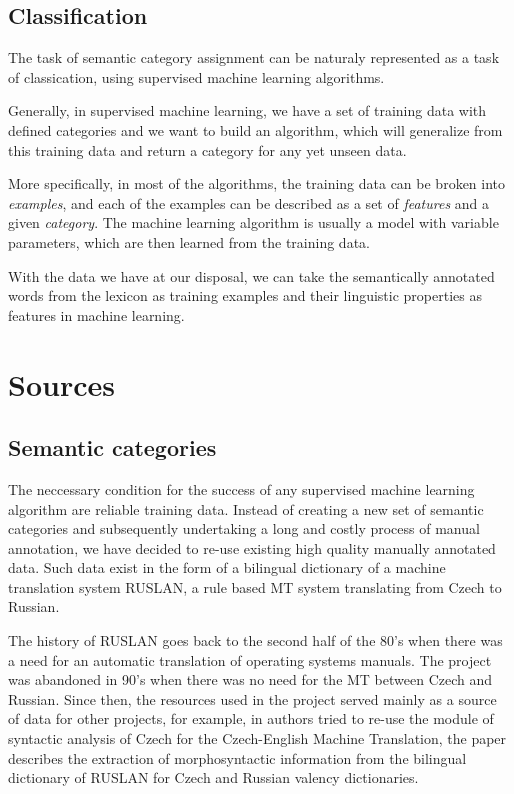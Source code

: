 \documentclass[letterpaper]{article}
\begin{document}
\subsection{Classification}
The task of semantic category assignment can be naturaly represented as a task of classication, using supervised machine learning algorithms.

Generally, in supervised machine learning, we have a set of training data with defined 
categories and we want to build an algorithm, which will generalize from this training data and return a category for any yet unseen data.

More specifically, in most of the algorithms, the training data can be broken into
\textit{examples}, and each of the examples can be described as a set of \textit{features} and a given \textit{category}. The machine learning algorithm is usually a model with variable parameters, which are then learned from the training data.

With the data we have at our disposal, we can take the semantically annotated words from the lexicon as training examples 
and their linguistic properties as features in machine learning.


\section{Sources}
\subsection{Semantic categories}
The neccessary condition for the success of any supervised machine learning algorithm are reliable training data. Instead of creating a new set of semantic categories and subsequently undertaking a long and costly process of manual annotation, we have decided to re-use existing high quality manually annotated data. Such data exist in the form of a bilingual dictionary of a machine translation system RUSLAN, a rule based MT system translating from Czech to Russian.

The history of RUSLAN \cite{oliva1989parser} goes back to the second half of the 80's when there was a need for an automatic translation of operating systems manuals. The project was abandoned in 90's when
there was no need for the MT between Czech and Russian. Since then, the resources used in the project served mainly as a source of data for other projects, for
example, in \cite{mt-recycled} authors tried to re-use the module
of syntactic analysis of Czech for the Czech-English Machine Translation,
the paper \cite{pisa2010} describes the extraction of morphosyntactic information from the bilingual dictionary of RUSLAN for Czech and Russian valency dictionaries.
\end{document}
